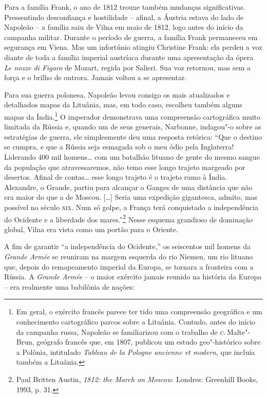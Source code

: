 Para a família Frank, o ano de 1812 trouxe também mudanças
significativas. Pressentindo desconfiança e hostilidade -- afinal, a
Áustria estava do lado de Napoleão -- a família saiu de Vilna em maio de
1812, logo antes do início da campanha militar. Durante o período de
guerra, a família Frank permaneceu em segurança em Viena. Mas um
infortúnio atingiu Christine Frank: ela perdeu a voz diante de toda a
família imperial austríaca durante uma apresentação da ópera \textit{Le
nozze di Figaro} de Mozart, regida por Salieri. Sua voz retornou, mas
sem a força e o brilho de outrora. Jamais voltou a se apresentar.

\asterisc

Para sua guerra polonesa, Napoleão levou consigo os mais atualizados e
detalhados mapas da Lituânia, mas, em todo caso, escolheu também alguns
mapas da Índia.\footnote{Em geral, o exército francês parece ter tido uma compreensão geográfica e um conhecimento cartográfico parcos sobre a Lituânia. Contudo, antes do início da campanha russa, Napoleão se familiarizou com o trabalho de \textsc{c}.\,Malte"-Brun, geógrafo francês que, em 1807, publicou um estudo geo"-histórico sobre a Polônia, intitulado \textit{Tableau de la Pologne ancienne et modern}, que incluía também a Lituânia.} O imperador demonstrava uma compreensão cartográfica muito limitada da Rússia e, quando um de seus generais, Narbonne, indagou"-o
sobre as estratégias de guerra, ele simplesmente deu uma resposta
retórica: ``Que o destino se cumpra, e que a Rússia seja esmagada sob o
meu ódio pela Inglaterra! Liderando 400 mil homens\ldots{} com
um batalhão lituano de gente do mesmo sangue da população que
atravessaremos, não temo esse longo trajeto margeado por desertos.
Afinal de contas\ldots{} esse longo trajeto é o trajeto rumo à Índia.
Alexandre, o Grande, partiu para alcançar o Ganges de uma distância que
não era maior do que a de Moscou. [\ldots{}] Seria uma expedição
gigantesca, admito, mas possível no século \textsc{xix}. Num só golpe, a França
terá conquistado a independência do Ocidente e a liberdade dos
mares.''\footnote{Paul Britten Austin, \textit{1812: the March on Moscow}. Londres: Greenhill Books, 1993, p. 31.} Nesse esquema grandioso de dominação global, Vilna era vista como um portão
para o Oriente.

A fim de garantir ``a independência do Ocidente,'' os seiscentos mil
homens da \textit{Grande Armée} se reuniram na margem esquerda do rio
Niemen, um rio lituano que, depois do remapeamento imperial da Europa,
se tornara a fronteira com a Rússia. A \textit{Grande Armée} -- o maior
exército jamais reunido na história da Europa -- era realmente uma
babilônia de nações:


